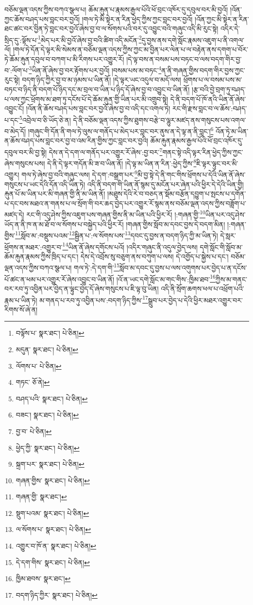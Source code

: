བཅོམ་ལྡན་འདས་ཀྱིས་བཀའ་སྩལ་པ། ཆོམ་རྐུན་པ་རྣམས་རྒྱལ་པོའི་ཕོ་བྲང་འཁོར་དུ་དབུལ་བར་མི་བྱའོ། །འོན་ཀྱང་ཆོས་བཤད་པས་བླང་བར་བྱའོ། །གལ་ཏེ་མི་སྟེར་ན་རིན་ཕྱེད་ཀྱིས་ཀྱང་བླང་བར་བྱའོ། །འོན་ཀྱང་མི་སྟེར་ན་རིན་ཐང་ཚང་བར་བྱིན་ཏེ་བླང་བར་བྱའོ་ཞེས་བྱ་བ་ལ་སོགས་པའི་བར་དུ་འབྱུང་བའི་གཞུང་འདི་མི་རུང་སྟེ། འདིར་དེ་སྲིད་དུ་:ལྟོས་པ་\footnote{བལྟོས་པ་  སྣར་ཐང་།  པེ་ཅིན། }མེད་པར་མི་བྱའོ་ཞེས་བྱ་བའི་ཚིག་འདི་མངོན་\footnote{མདུན་  སྣར་ཐང་།  པེ་ཅིན། }དུ་བྱས་ནས་དགེ་སློང་རྣམས་འཇུག་པ་ནི་འགལ་ལོ། །གལ་ཏེ་དོན་དེ་ལྟར་མི་སེམས་ན་བཅོམ་ལྡན་འདས་ཀྱིས་ཀྱང་མ་བྱིན་པར་ལེན་པ་ལ་བརྟེན་ནས་དགག་པ་བོར་ཏེ་ཆོམ་རྐུན་དབུལ་བ་བཀག་པ་མི་རིགས་པར་འགྱུར་རོ། །དེ་ལྟ་བས་ན་བསམ་པས་བཏང་བ་ལས་བདག་གིར་བྱ་བ་:ལོག་པ་\footnote{ལོགས་པ་  པེ་ཅིན། }ཡིན་ནོ་ཞེས་བྱ་བར་རྟོགས་པར་བྱའོ། །བསམ་པས་མ་བཏང་\footnote{གཏང་  ཅོ་ནེ། }ན་ནི་གཞན་གྱིས་བདག་གིར་བྱས་ཀྱང་རུང་སྟེ། བདག་ཉིད་ཀྱིར་བྱ་བ་མ་ཉམས་པ་ཡིན་ནོ། །དེ་ལྟར་ཡང་འདུལ་བ་མདོ་ལས། ཕྲོགས་པ་ལ་བསམ་པས་མ་བཏང་བ་ཉིད་ནི་བདག་པོ་ཉིད་དང་མ་བྲལ་བ་ཡིན་པ་ཉིད་དོ་ཞེས་བྱ་བ་འབྱུང་བ་ཡིན་ནོ། །རྩ་བའི་བྱེ་བྲག་ཏུ་བཤད་པ་ལས་ཀྱང་ཕྲོགས་མ་ཐག་ཏུ་དངོས་པོ་དེ་ཆོམ་རྐུན་གྱི་ཡིན་པར་མི་འགྲུབ་སྟེ། དེ་ནི་བདག་པོ་ཁོ་ནའི་ཡིན་ནོ་ཞེས་འབྱུང་ངོ། །འོན་ནི་ཆོས་བཤད་པས་བླང་བར་བྱའོ་ཞེས་བྱ་བ་འདི་དང་འགལ་ཏེ། རང་གི་རྫས་བླང་བ་ལ་ཆོས་:བཤད་པ་དང་\footnote{བཤད་པའི་  སྣར་ཐང་།  པེ་ཅིན། }འབྲེལ་བ་ཅི་ཡོད་ཅེ་ན། དེ་ནི་བཅོམ་ལྡན་འདས་ཀྱིས་ཐུགས་བརྩེ་བ་ལྷུར་མཛད་ནས་གསུངས་པས་འགལ་བ་མེད་དོ། །གཞུང་གི་དོན་ནི་གལ་ཏེ་ལུས་ལ་གནོད་པ་མེད་པར་བླང་བར་ནུས་ན་དེ་ལྟ་ན་ནི་བླང་།\footnote{བཟང་།  སྣར་ཐང་།  པེ་ཅིན། } འོན་ཏེ་མ་ཡིན་ན་ཆོས་བཤད་པས་བླང་བར་བྱ་བ་འམ་རིན་གྱིས་ཀྱང་བླང་བར་བྱའི། ཆོམ་རྐུན་རྣམས་རྒྱལ་པོའི་ཕོ་བྲང་འཁོར་དུ་དབུལ་བར་མི་བྱ་སྟེ། དེས་ན་དེ་དག་ལ་གནོད་པར་འགྱུར་རོ་ཞེས་:བྱ་བར་\footnote{བྱ་བ་  པེ་ཅིན། }གནང་སྟེ་འདི་ལྟར་རིན་ཕྱེད་ཀྱིས་ཀྱང་ཞེས་གསུངས་པས། དེ་ནི་དེ་ལྟར་གདོན་མི་ཟ་བ་ཡིན་ནོ། །དེ་ལྟ་མ་ཡིན་ན་རིན་:ཕྱེད་ཀྱིས་\footnote{ཕྱེད་ཀྱི་  སྣར་ཐང་།  པེ་ཅིན། }ཇི་ལྟར་ལྟུང་བར་མི་འགྱུར། གལ་ཏེ་ཞེས་བྱ་བའི་གཞུང་ལས། དེ་དག་:བསྒྲག་པར་\footnote{སྐྲག་པར་  སྣར་ཐང་།  པེ་ཅིན། }མི་བྱ་སྟེ་དེ་ནི་གང་གིས་ཕྲོགས་པ་དེའི་ཡིན་ནོ་ཞེས་གསུངས་པ་ཡང་དེའི་དོན་འདི་ཡིན་ཏེ། འདི་ནི་བདག་གི་ཡིན་ནོ་སྙམ་དུ་མངོན་པར་ཞེན་པའི་ཕྱིར་དེ་དེའི་ཡིན་གྱི། རྐུན་པོ་མ་ཡིན་པར་མི་གཞན་གྱི་ནི་མ་ཡིན་ནོ། །མཐུས་དེའི་རེ་བ་བཅད་ན་སྡོམ་བརྩོན་དབྱུག་པ་སྤངས་པ་དགོན་པ་དང་བས་མཐའ་ན་གནས་པ་ལ་སྲོག་གི་བར་ཆད་བྱེད་པར་འགྱུར་རོ་སྙམ་ནས་བཅོམ་ལྡན་འདས་ཀྱིས་བཟློག་པ་མཛད་དེ། རང་གི་འདུ་ཤེས་ཀྱིས་འཇུག་པས་གཞན་གྱིས་ནི་མ་ཡིན་པའི་ཕྱིར་རོ། །:གཞན་གྱི་\footnote{གཞན་གྱིས་  སྣར་ཐང་།  པེ་ཅིན། }ཡིན་པར་འདུ་ཤེས་ཡོད་ན་ནི་ཁ་ན་མ་ཐོ་བ་ལ་སོགས་པ་བསྐྱེད་པའི་ཕྱིར་རོ། །གཞན་གྱིས་སློབ་མ་དབང་བྱས་དེ་བདག་མིན། །:གཞན་གྱིས་\footnote{གཞན་གྱི་  སྣར་ཐང་། }སློབ་མ་:བསྡུས་པའམ་\footnote{སྡུག་པའམ་  སྣར་ཐང་།  པེ་ཅིན། }སྦྱིན་པ་:ལ་སོགས་པས་\footnote{ལ་སོགས་པ་  སྣར་ཐང་།  པེ་ཅིན། }དབང་དུ་བྱས་ན་བདག་ཉིད་ཀྱི་མ་ཡིན་ཏེ། དེ་སླར་ཕྲོགས་ན་མཐར་:འགྱུར་བ་\footnote{འགྱུར་བ་ཁོ་ན་  སྣར་ཐང་།  པེ་ཅིན། }ཡིན་ནོ་ཞེས་དགོངས་པའོ། །འདིར་གཞུང་ནི་འདུལ་བྱེད་ལས། དགེ་སློང་གི་སློབ་མ་ཆོམ་རྐུན་རྣམས་ཀྱིས་ཁྲིད་པ་དང་། དེས་དེ་འབྲོས་སུ་བཅུག་ནས་བཀུག་པ་ལས། དེ་འགྱོད་པ་སྐྱེས་པ་དང་། བཅོམ་ལྡན་འདས་ཀྱིས་བཀའ་སྩལ་པ། གལ་ཏེ་:དེ་དག་གི་\footnote{དེ་དག་གིས་  སྣར་ཐང་།  པེ་ཅིན། }སློབ་མ་དབང་དུ་བྱས་པ་ལས་འགུགས་པར་བྱེད་པ་ན་དངོས་པོ་ཚང་ན་ཕམ་པར་འགྱུར་རོ་ཞེས་འབྱུང་བ་ཡིན་ནོ། །འོ་ན་ཡང་དགེ་སློང་མ་གང་གིས་:ཁྱིམ་ཐབ་\footnote{ཁྱིམ་ཐབས་  སྣར་ཐང་། }ཀྱིས་མ་གནང་བར་རབ་ཏུ་འབྱིན་པར་བྱེད་ན་ལྟུང་བྱེད་དོ་ཞེས་གསུངས་པ་ཇི་ལྟ་བུ་ཡིན། འདི་ནི་སྲོག་ཆགས་ཕལ་པ་འཕྲོག་པའི་རྣམ་པ་ཡིན་ཏེ། མ་གནད་པ་རབ་ཏུ་འབྱིན་པས་:བདག་ཉིད་ཀྱིས་\footnote{བདག་ཉིད་ཀྱིར་  སྣར་ཐང་།  པེ་ཅིན། }སྒྲུབ་པར་བྱེད་པ་དེའི་ཕྱིར་མཐར་འགྱུར་བར་རིགས་སོ་ཞེ་ན། 